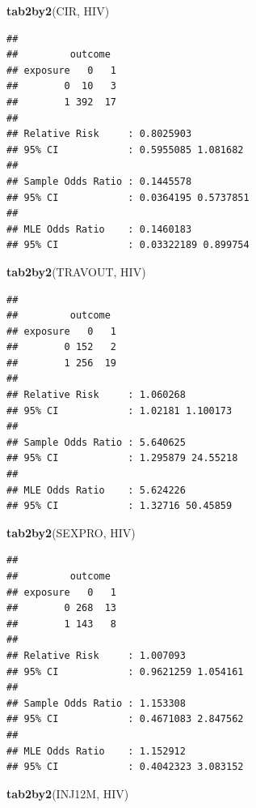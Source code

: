\documentclass[12pt,a4paper]{book}
\newenvironment{Shaded}{\begin{snugshade}}{\end{snugshade}}
\newcommand{\KeywordTok}[1]{\textcolor[rgb]{0.13,0.29,0.53}{\textbf{#1}}}
\newcommand{\NormalTok}[1]{#1}
\theoremstyle{definition}
\theoremstyle{definition}
\theoremstyle{definition}
\theoremstyle{remark}
\begin{document}
\newpage

\begin{Shaded}
\begin{Highlighting}[]
\KeywordTok{tab2by2}\NormalTok{(CIR, HIV)}
\end{Highlighting}
\end{Shaded}

\begin{verbatim}
## 
##         outcome
## exposure   0   1
##        0  10   3
##        1 392  17
## 
## Relative Risk     : 0.8025903 
## 95% CI            : 0.5955085 1.081682 
## 
## Sample Odds Ratio : 0.1445578 
## 95% CI            : 0.0364195 0.5737851 
## 
## MLE Odds Ratio    : 0.1460183 
## 95% CI            : 0.03322189 0.899754
\end{verbatim}

\begin{Shaded}
\begin{Highlighting}[]
\KeywordTok{tab2by2}\NormalTok{(TRAVOUT, HIV)}
\end{Highlighting}
\end{Shaded}

\begin{verbatim}
## 
##         outcome
## exposure   0   1
##        0 152   2
##        1 256  19
## 
## Relative Risk     : 1.060268 
## 95% CI            : 1.02181 1.100173 
## 
## Sample Odds Ratio : 5.640625 
## 95% CI            : 1.295879 24.55218 
## 
## MLE Odds Ratio    : 5.624226 
## 95% CI            : 1.32716 50.45859
\end{verbatim}

\newpage

\begin{Shaded}
\begin{Highlighting}[]
\KeywordTok{tab2by2}\NormalTok{(SEXPRO, HIV)}
\end{Highlighting}
\end{Shaded}

\begin{verbatim}
## 
##         outcome
## exposure   0   1
##        0 268  13
##        1 143   8
## 
## Relative Risk     : 1.007093 
## 95% CI            : 0.9621259 1.054161 
## 
## Sample Odds Ratio : 1.153308 
## 95% CI            : 0.4671083 2.847562 
## 
## MLE Odds Ratio    : 1.152912 
## 95% CI            : 0.4042323 3.083152
\end{verbatim}

\begin{Shaded}
\begin{Highlighting}[]
\KeywordTok{tab2by2}\NormalTok{(INJ12M, HIV)}
\end{Highlighting}
\end{Shaded}
\end{document}

